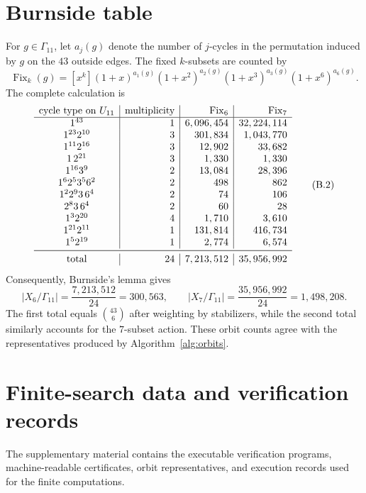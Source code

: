 \documentclass[11pt]{article}
\numberwithin{equation}{section}
\begin{document}
\section{Burnside table}\label{app:burnside}
For $g\in\Gamma_{11}$, let $a_j(g)$ denote the number of $j$-cycles in the
permutation induced by $g$ on the $43$ outside edges. The fixed $k$-subsets
are counted by
\[
\operatorname{Fix}_k(g)=[x^k]
(1+x)^{a_1(g)}(1+x^2)^{a_2(g)}
(1+x^3)^{a_3(g)}(1+x^6)^{a_6(g)}.
\tag{B.1}
\]
The complete calculation is
\[
\begin{array}{c|r|r|r}
\text{cycle type on }U_{11}&\text{multiplicity}&\operatorname{Fix}_6&\operatorname{Fix}_7\\
\hline
1^{43}&1&6,096,454&32,224,114\\
1^{23}2^{10}&3&301,834&1,043,770\\
1^{11}2^{16}&3&12,902&33,682\\
1\,2^{21}&3&1,330&1,330\\
1^{16}3^9&2&13,084&28,396\\
1^6 2^5 3^5 6^2&2&498&862\\
1^2 2^9 3\,6^4&2&74&106\\
2^8 3\,6^4&2&60&28\\
1^3 2^{20}&4&1,710&3,610\\
1^{21}2^{11}&1&131,814&416,734\\
1^5 2^{19}&1&2,774&6,574\\
\midrule
\text{total}&24&7,213,512&35,956,992
\end{array}
\tag{B.2}
\]
Consequently, Burnside's lemma gives
\[
|X_6/\Gamma_{11}|=\frac{7,213,512}{24}=300,563,
\qquad
|X_7/\Gamma_{11}|=\frac{35,956,992}{24}=1,498,208.
\tag{B.3}
\]
The first total equals
$\binom{43}{6}$ after weighting by stabilizers, while the second total
similarly accounts for the $7$-subset action. These orbit counts agree with
the representatives produced by Algorithm~\ref{alg:orbits}.

\section{Finite-search data and verification records}\label{app:records}
The supplementary material contains the executable verification programs, machine-readable certificates, orbit representatives, and execution records used for the finite computations.
\end{document}
